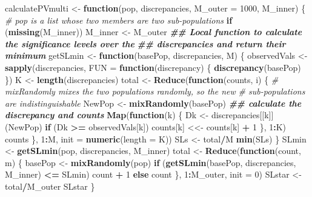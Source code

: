 \documentclass[
]{article}
\newenvironment{Shaded}{\begin{snugshade}}{\end{snugshade}}
\newcommand{\AttributeTok}[1]{\textcolor[rgb]{0.13,0.29,0.53}{#1}}
\newcommand{\CommentTok}[1]{\textcolor[rgb]{0.56,0.35,0.01}{\textit{#1}}}
\newcommand{\ControlFlowTok}[1]{\textcolor[rgb]{0.13,0.29,0.53}{\textbf{#1}}}
\newcommand{\DecValTok}[1]{\textcolor[rgb]{0.00,0.00,0.81}{#1}}
\newcommand{\DocumentationTok}[1]{\textcolor[rgb]{0.56,0.35,0.01}{\textbf{\textit{#1}}}}
\newcommand{\FunctionTok}[1]{\textcolor[rgb]{0.13,0.29,0.53}{\textbf{#1}}}
\newcommand{\NormalTok}[1]{#1}
\newcommand{\OtherTok}[1]{\textcolor[rgb]{0.56,0.35,0.01}{#1}}
\newcommand{\SpecialCharTok}[1]{\textcolor[rgb]{0.81,0.36,0.00}{\textbf{#1}}}
\begin{document}
\begin{Shaded}
\begin{Highlighting}[]
\NormalTok{calculatePVmulti }\OtherTok{\textless{}{-}} \ControlFlowTok{function}\NormalTok{(pop, discrepancies, }\AttributeTok{M\_outer =} \DecValTok{1000}\NormalTok{, M\_inner) \{}
  \CommentTok{\# pop is a list whose two members are two sub{-}populations}
  \ControlFlowTok{if}\NormalTok{ (}\FunctionTok{missing}\NormalTok{(M\_inner))}
\NormalTok{    M\_inner }\OtherTok{\textless{}{-}}\NormalTok{ M\_outer}
  \DocumentationTok{\#\# Local function to calculate the significance levels over the}
  \DocumentationTok{\#\# discrepancies and return their minimum}
\NormalTok{  getSLmin }\OtherTok{\textless{}{-}} \ControlFlowTok{function}\NormalTok{(basePop, discrepancies, M) \{}
\NormalTok{    observedVals }\OtherTok{\textless{}{-}} \FunctionTok{sapply}\NormalTok{(discrepancies, }\AttributeTok{FUN =} \ControlFlowTok{function}\NormalTok{(discrepancy) \{}
      \FunctionTok{discrepancy}\NormalTok{(basePop)}
\NormalTok{    \})}
\NormalTok{    K }\OtherTok{\textless{}{-}} \FunctionTok{length}\NormalTok{(discrepancies)}
\NormalTok{    total }\OtherTok{\textless{}{-}} \FunctionTok{Reduce}\NormalTok{(}\ControlFlowTok{function}\NormalTok{(counts, i) \{}
      \CommentTok{\# mixRandomly mixes the two populations randomly, so the new}
      \CommentTok{\# sub{-}populations are indistinguishable}
\NormalTok{      NewPop }\OtherTok{\textless{}{-}} \FunctionTok{mixRandomly}\NormalTok{(basePop)}
      \DocumentationTok{\#\# calculate the discrepancy and counts}
      \FunctionTok{Map}\NormalTok{(}\ControlFlowTok{function}\NormalTok{(k) \{}
\NormalTok{        Dk }\OtherTok{\textless{}{-}}\NormalTok{ discrepancies[[k]](NewPop)}
        \ControlFlowTok{if}\NormalTok{ (Dk }\SpecialCharTok{\textgreater{}=}\NormalTok{ observedVals[k])}
\NormalTok{          counts[k] }\OtherTok{\textless{}\textless{}{-}}\NormalTok{ counts[k] }\SpecialCharTok{+} \DecValTok{1}
\NormalTok{      \}, }\DecValTok{1}\SpecialCharTok{:}\NormalTok{K)}
\NormalTok{      counts}
\NormalTok{    \}, }\DecValTok{1}\SpecialCharTok{:}\NormalTok{M, }\AttributeTok{init =} \FunctionTok{numeric}\NormalTok{(}\AttributeTok{length =}\NormalTok{ K))}
\NormalTok{    SLs }\OtherTok{\textless{}{-}}\NormalTok{ total}\SpecialCharTok{/}\NormalTok{M}
    \FunctionTok{min}\NormalTok{(SLs)}
\NormalTok{  \}}
\NormalTok{  SLmin }\OtherTok{\textless{}{-}} \FunctionTok{getSLmin}\NormalTok{(pop, discrepancies, M\_inner)}
\NormalTok{  total }\OtherTok{\textless{}{-}} \FunctionTok{Reduce}\NormalTok{(}\ControlFlowTok{function}\NormalTok{(count, m) \{}
\NormalTok{    basePop }\OtherTok{\textless{}{-}} \FunctionTok{mixRandomly}\NormalTok{(pop)}
    \ControlFlowTok{if}\NormalTok{ (}\FunctionTok{getSLmin}\NormalTok{(basePop, discrepancies, M\_inner) }\SpecialCharTok{\textless{}=}\NormalTok{ SLmin)}
\NormalTok{      count }\SpecialCharTok{+} \DecValTok{1} \ControlFlowTok{else}\NormalTok{ count}
\NormalTok{  \}, }\DecValTok{1}\SpecialCharTok{:}\NormalTok{M\_outer, }\AttributeTok{init =} \DecValTok{0}\NormalTok{)}
\NormalTok{  SLstar }\OtherTok{\textless{}{-}}\NormalTok{ total}\SpecialCharTok{/}\NormalTok{M\_outer}
\NormalTok{  SLstar}
\NormalTok{\}}
\end{Highlighting}
\end{Shaded}
\end{document}

